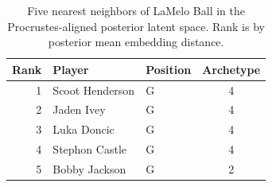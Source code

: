 \begin{table}[htbp]
  \centering\small
  \begin{tabular}{rllc}
    \toprule
    Rank & Player & Position & Archetype \\
    \midrule
    1 & Scoot Henderson & G & 4 \\
    2 & Jaden Ivey & G & 4 \\
    3 & Luka Doncic & G & 4 \\
    4 & Stephon Castle & G & 4 \\
    5 & Bobby Jackson & G & 2 \\
    \bottomrule
  \end{tabular}
  \caption{Five nearest neighbors of LaMelo Ball in the Procrustes-aligned posterior latent space. Rank is by posterior mean embedding distance.}
  \label{tab:LaMelo_Ball_neighbors}
\end{table}

